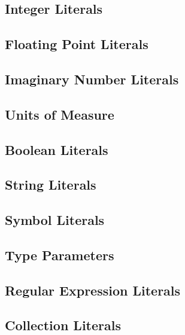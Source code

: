 \subsection{Integer Literals}\label{sec:integerliterals}

\subsection{Floating Point Literals}\label{sec:floatliterals}

\subsection{Imaginary Number Literals}\label{sec:imaginaryliterals}

\subsection{Units of Measure}\label{sec:unitsofmeasuresyntax}

\subsection{Boolean Literals}\label{sec:booleanliterals}

\subsection{String Literals}\label{sec:stringliterals}

\subsection{Symbol Literals}\label{sec:symbolliterals}

\subsection{Type Parameters}\label{sec:typeparameterliterals}

\subsection{Regular Expression Literals}\label{sec:regexpliterals}

\subsection{Collection Literals}\label{sec:collectionliterals}

